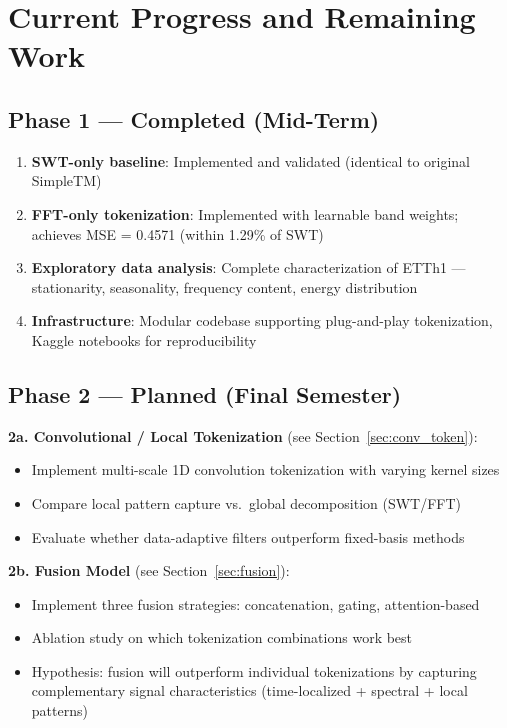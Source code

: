 \documentclass[12pt,a4paper]{article}
\begin{document}
\section{Current Progress and Remaining Work}

\subsection{Phase 1 --- Completed (Mid-Term)}

\begin{enumerate}[noitemsep]
  \item \textbf{SWT-only baseline}: Implemented and validated (identical to original SimpleTM)
  \item \textbf{FFT-only tokenization}: Implemented with learnable band weights; achieves MSE = 0.4571 (within 1.29\% of SWT)
  \item \textbf{Exploratory data analysis}: Complete characterization of ETTh1 --- stationarity, seasonality, frequency content, energy distribution
  \item \textbf{Infrastructure}: Modular codebase supporting plug-and-play tokenization, Kaggle notebooks for reproducibility
\end{enumerate}

\subsection{Phase 2 --- Planned (Final Semester)}

\textbf{2a. Convolutional / Local Tokenization} (see Section~\ref{sec:conv_token}):
\begin{itemize}[noitemsep]
  \item Implement multi-scale 1D convolution tokenization with varying kernel sizes
  \item Compare local pattern capture vs.\ global decomposition (SWT/FFT)
  \item Evaluate whether data-adaptive filters outperform fixed-basis methods
\end{itemize}

\textbf{2b. Fusion Model} (see Section~\ref{sec:fusion}):
\begin{itemize}[noitemsep]
  \item Implement three fusion strategies: concatenation, gating, attention-based
  \item Ablation study on which tokenization combinations work best
  \item Hypothesis: fusion will outperform individual tokenizations by capturing complementary signal characteristics (time-localized + spectral + local patterns)
\end{itemize}
\end{document}
